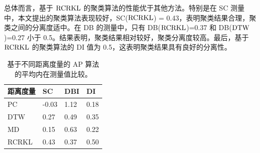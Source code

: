 总体而言，基于 $\rm{RCRKL}$ 的聚类算法的性能优于其他方法。特别是在 SC 测量中，本文提出的聚类算法表现较好，SC($\rm{RCRKL}$) = 0.43，表明聚类结果合理，聚类之间的分离度适中。在 DB 的测量中，只有 DB($\rm{RCRKL}$)=0.37 和 DB($\rm{DTW}$)=0.27 小于 0.5。结果表明，聚类结果相对较好，聚类分离度较高。最后，基于 $\rm{RCRKL}$ 的聚类算法的 DI 值为 0.5，这表明聚类结果具有良好的分离性。

\begin{table}[!ht]
\fontsize{8}{14}\selectfont
\centering
\caption{基于不同距离度量的 AP 算法的平均内在测量值比较。}
\begin{tabular}{llll}
 \hline
 距离度量 &  SC & DBI & DI\\
  \hline
  PC &  -0.03 & 1.12 &0.18\\
  \hline
  DTW &  0.27 & 0.49 &0.35\\
  \hline
  MD &  0.15 & 0.63 &0.22\\
  \hline
  RCRKL &  0.43 & 0.37 &0.50\\
  \hline
\end{tabular}
\label{table2}
\end{table}

